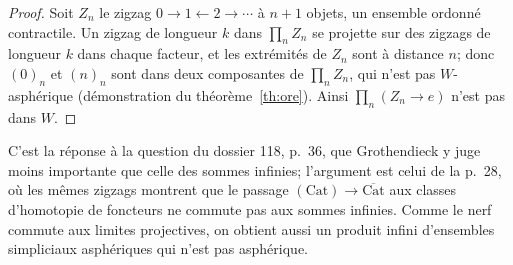 \begin{proof}
Soit $Z_n$ le zigzag $0\to1\leftarrow2\to\cdots$ à $n+1$ objets, un ensemble ordonné contractile. Un zigzag de longueur $k$ dans $\prod_n Z_n$ se projette sur des zigzags de longueur $k$ dans chaque facteur, et les extrémités de $Z_n$ sont à distance $n$; donc $(0)_n$ et $(n)_n$ sont dans deux composantes de $\prod_n Z_n$, qui n'est pas $W$-asphérique (démonstration du théorème~\ref{th:ore}). Ainsi $\prod_n(Z_n\to e)$ n'est pas dans $W$.
\end{proof}

C'est la réponse à la question du dossier 118, p.~36, que Grothendieck y juge moins importante que celle des sommes infinies; l'argument est celui de la p.~28, où les mêmes zigzags montrent que le passage $(\mathrm{Cat})\to\overline{\mathrm{Cat}}$ aux classes d'homotopie de foncteurs ne commute pas aux sommes infinies. Comme le nerf commute aux limites projectives, on obtient aussi un produit infini d'ensembles simpliciaux asphériques qui n'est pas asphérique.

